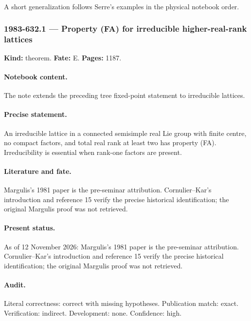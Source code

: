 A short generalization follows Serre's examples in the physical notebook order.

\subsubsection{1983-632.1 --- Property (FA) for irreducible higher-real-rank lattices}

\label{item:1983-632.1}

\noindent\textbf{Kind:} theorem. \textbf{Fate:} E. \textbf{Pages:} 1187.\par

\paragraph{Notebook content.} The note extends the preceding tree fixed-point statement to irreducible lattices.

\paragraph{Precise statement.} An irreducible lattice in a connected semisimple real Lie group with finite centre, no compact factors, and total real rank at least two has property (FA). Irreducibility is essential when rank-one factors are present.

\paragraph{Literature and fate.} Margulis's 1981 paper is the pre-seminar attribution. Cornulier--Kar's introduction and reference 15 verify the precise historical identification; the original Margulis proof was not retrieved.

\paragraph{Present status.} As of 12 November 2026: Margulis's 1981 paper is the pre-seminar attribution. Cornulier--Kar's introduction and reference 15 verify the precise historical identification; the original Margulis proof was not retrieved.

\paragraph{Audit.} Literal correctness: correct with missing hypotheses. Publication match: exact. Verification: indirect. Development: none. Confidence: high.

